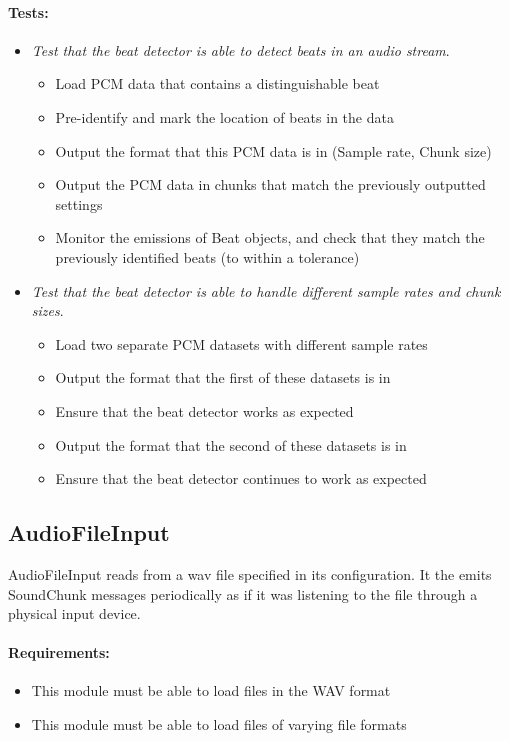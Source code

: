 \documentclass[english,12pt]{scrartcl}
\newcounter{testcounter}
\newcommand{\test}[1] {
	\stepcounter{testcounter}
	\item[] \emph{#1}.}
\begin{document}
		\paragraph{Tests:}
		\begin{itemize}
			\test{Test that the beat detector is able to detect beats in an audio stream}
			\begin{itemize}
				\item Load PCM data that contains a distinguishable beat
				\item Pre-identify and mark the location of beats in the data
				\item Output the format that this PCM data is in (Sample rate, Chunk size)
				\item Output the PCM data in chunks that match the previously outputted settings
				\item Monitor the emissions of Beat objects, and check that they match the previously identified beats (to within a tolerance)
			\end{itemize}

			\test{Test that the beat detector is able to handle different sample rates and chunk sizes}
			\begin{itemize}
				\item Load two separate PCM datasets with different sample rates
				\item Output the format that the first of these datasets is in
				\item Ensure that the beat detector works as expected
				\item Output the format that the second of these datasets is in
				\item Ensure that the beat detector continues to work as expected
			\end{itemize}
		\end{itemize}

	\subsection{AudioFileInput}
		AudioFileInput reads from a wav file specified in its configuration.
		It the emits SoundChunk messages periodically as if it was listening to the file through a physical input device.

		\paragraph{Requirements:}
		\begin{itemize}
			\item This module must be able to load files in the WAV format
			\item This module must be able to load files of varying file formats
		\end{itemize}
\end{document}
